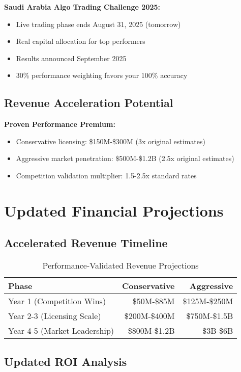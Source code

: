 \documentclass[11pt,letterpaper]{article}
\begin{document}
\textbf{Saudi Arabia Algo Trading Challenge 2025:}
\begin{itemize}
\item Live trading phase ends August 31, 2025 (tomorrow)
\item Real capital allocation for top performers
\item Results announced September 2025
\item 30\% performance weighting favors your 100\% accuracy
\end{itemize}

\subsection{Revenue Acceleration Potential}

\textbf{Proven Performance Premium:}
\begin{itemize}
\item Conservative licensing: \$150M-\$300M (3x original estimates)
\item Aggressive market penetration: \$500M-\$1.2B (2.5x original estimates)
\item Competition validation multiplier: 1.5-2.5x standard rates
\end{itemize}

\section{Updated Financial Projections}

\subsection{Accelerated Revenue Timeline}

\begin{table}[h]
\centering
\begin{tabular}{@{}lrr@{}}
\toprule
\textbf{Phase} & \textbf{Conservative} & \textbf{Aggressive} \\
\midrule
Year 1 (Competition Wins) & \$50M-\$85M & \$125M-\$250M \\
Year 2-3 (Licensing Scale) & \$200M-\$400M & \$750M-\$1.5B \\
Year 4-5 (Market Leadership) & \$800M-\$1.2B & \$3B-\$6B \\
\bottomrule
\end{tabular}
\caption{Performance-Validated Revenue Projections}
\end{table}

\subsection{Updated ROI Analysis}
\end{document}

